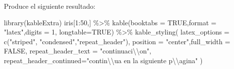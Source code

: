 \documentclass[12pt,a4paper,oneside,]{book}
\newenvironment{Shaded}{\begin{snugshade}}{\end{snugshade}}
\newcommand{\AttributeTok}[1]{\textcolor[rgb]{0.77,0.63,0.00}{#1}}
\newcommand{\ConstantTok}[1]{\textcolor[rgb]{0.00,0.00,0.00}{#1}}
\newcommand{\DecValTok}[1]{\textcolor[rgb]{0.00,0.00,0.81}{#1}}
\newcommand{\FunctionTok}[1]{\textcolor[rgb]{0.00,0.00,0.00}{#1}}
\newcommand{\NormalTok}[1]{#1}
\newcommand{\SpecialCharTok}[1]{\textcolor[rgb]{0.00,0.00,0.00}{#1}}
\newcommand{\StringTok}[1]{\textcolor[rgb]{0.31,0.60,0.02}{#1}}
\numberwithin{dummy}{section}
\theoremstyle{ocrenumbox}
\theoremstyle{blacknumex}
\theoremstyle{blacknumbox}
\theoremstyle{ocrenum}
\theoremstyle{ocrenum}
\begin{document}
Produce el siguiente resultado:

\begin{Shaded}
\begin{Highlighting}[]
\FunctionTok{library}\NormalTok{(kableExtra) }
\NormalTok{iris[}\DecValTok{1}\SpecialCharTok{:}\DecValTok{50}\NormalTok{,] }\SpecialCharTok{\%\textgreater{}\%} 
  \FunctionTok{kable}\NormalTok{(}\AttributeTok{booktabs =} \ConstantTok{TRUE}\NormalTok{,}\AttributeTok{format =} \StringTok{"latex"}\NormalTok{,}\AttributeTok{digits =} \DecValTok{1}\NormalTok{, }\AttributeTok{longtable=}\ConstantTok{TRUE}\NormalTok{) }\SpecialCharTok{\%\textgreater{}\%}
  \FunctionTok{kable\_styling}\NormalTok{(}
   \AttributeTok{latex\_options =} \FunctionTok{c}\NormalTok{(}\StringTok{"striped"}\NormalTok{, }\StringTok{"condensed"}\NormalTok{,}\StringTok{"repeat\_header"}\NormalTok{), }
   \AttributeTok{position =} \StringTok{"center"}\NormalTok{,}\AttributeTok{full\_width =} \ConstantTok{FALSE}\NormalTok{,}
   \AttributeTok{repeat\_header\_text =} \StringTok{"continuaci}\SpecialCharTok{\textbackslash{}\textbackslash{}}\StringTok{\textquotesingle{}on"}\NormalTok{, }
   \AttributeTok{repeat\_header\_continued=}\StringTok{"contin}\SpecialCharTok{\textbackslash{}\textbackslash{}}\StringTok{\textquotesingle{}ua en la siguiente p}\SpecialCharTok{\textbackslash{}\textbackslash{}}\StringTok{\textquotesingle{}agina"}
\NormalTok{  )}
\end{Highlighting}
\end{Shaded}
\end{document}
